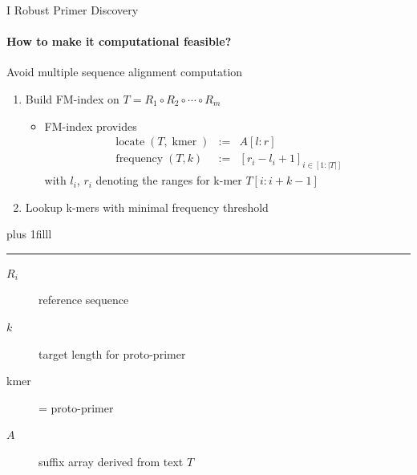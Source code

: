 \documentclass[xcolor=dvipsnames,envcountsect]{beamer}
\newcommand{\flushdown}{\vskip0pt plus 1filll}
\begin{document}
\begin{frame}{I Robust Primer Discovery}
\framesubtitle{How to make it computational feasible?}
Avoid multiple sequence alignment computation
    \begin{enumerate}
        \item Build FM-index \cite{Ferragina2005} on $T = R_1 \circ  R_2 \circ \cdots \circ R_m$  %
        \begin{itemize}
            \item FM-index provides
            \begin{eqnarray*}
            \operatorname{locate} (T, \operatorname{kmer}) &:=& A[l:r]\\
            \operatorname{frequency} (T, k) &:=& [r_i - l_i + 1]_{i\in [1:|T|]}
            \end{eqnarray*}
            with $l_i$, $r_i$ denoting the ranges for k-mer $T[i:i+k-1]$
        \end{itemize}
        \item Lookup k-mers with minimal frequency threshold
    \end{enumerate}
\flushdown
\rule{\textwidth}{.8pt} 
{\footnotesize
\begin{description}
    \item[$R_i$] reference sequence
    \item[$k$] target length for proto-primer
    \item[kmer] = proto-primer
    \item[$A$] suffix array derived from text $T$ 
\end{description}
}
\end{frame}
\end{document}
